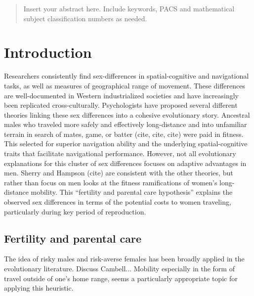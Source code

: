 \date{Received: date / Accepted: date}


\maketitle

\begin{abstract}
Insert your abstract here. Include keywords, PACS and mathematical
subject classification numbers as needed.
\end{abstract}

\section{Introduction}
\label{sec:1}
Researchers consistently find sex-differences in spatial-cognitive and navigational tasks, as well as measures of geographical range of movement.  These differences are well-documented in Western industrialized societies and have increasingly been replicated cross-culturally.  Psychologists have proposed several different theories linking these sex differences into a cohesive evolutionary story.  Ancestral males who traveled more safely and effectively long-distance and into unfamiliar terrain in search of mates, game, or batter (cite, cite, cite) were paid in fitness.  This selected for superior navigation ability and the underlying spatial-cognitive traits that facilitate navigational performance.  However, not all evolutionary explanations for this cluster of sex differences focuses on adaptive advantages in men.  Sherry and Hampson (cite) are consistent with the other theories, but rather than focus on men looks at the fitness ramifications of women's long-distance mobility.  This ``fertility and parental care hypothesis'' explains the observed sex differences in terms of the potential costs to women traveling, particularly during key period of reproduction.

	\subsection{Fertility and parental care}
	\label{sec:1.1}
The idea of risky males and risk-averse females has been broadly applied in the evolutionary literature.  Discuss Cambell... Mobility especially in the form of travel outside of one's home range, seems a particularly appropriate topic for applying this heuristic.  

